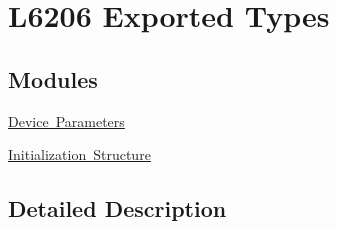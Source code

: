 \hypertarget{group___l6206___exported___types}{}\section{L6206 Exported Types}
\label{group___l6206___exported___types}
\subsection*{Modules}
\begin{DoxyCompactItemize}
\item 
\mbox{\hyperlink{group___device___parameters}{Device Parameters}}
\item 
\mbox{\hyperlink{group___initialization___structure}{Initialization Structure}}
\end{DoxyCompactItemize}


\subsection{Detailed Description}
